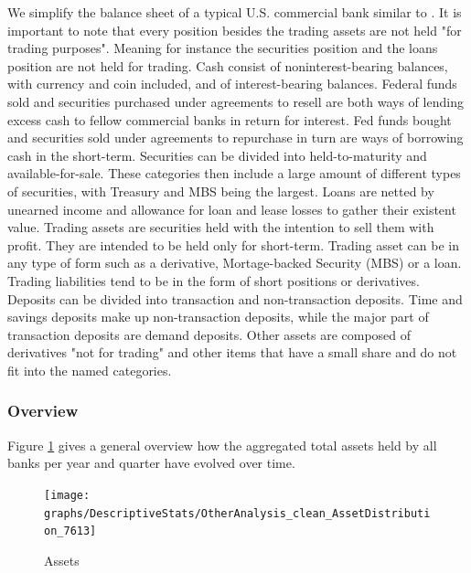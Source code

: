 \documentclass[12pt, a4paper]{article} %
\begin{document}
We simplify the balance sheet of a typical U.S. commercial bank similar to \citet{DrechslerSchnabel2017}.
It is important to note that every position besides the trading assets are not held "for trading purposes". Meaning for instance the securities position and the loans position are not held for trading.
Cash consist of noninterest-bearing balances, with currency and coin included, and of interest-bearing balances.
Federal funds sold and securities purchased under agreements to resell are both ways of lending excess cash to fellow commercial banks in return for interest. Fed funds bought and securities sold under agreements to repurchase in turn are ways of borrowing cash in the short-term. Securities can be divided into held-to-maturity and available-for-sale. These categories then include a large amount of different types of securities, with Treasury and MBS being the largest. Loans are netted by unearned income and allowance for loan and lease losses to gather their existent value. Trading assets are securities held with the intention to sell them with profit. They are intended to be held only for short-term. Trading asset can be in any type of form such as a derivative, Mortage-backed Security (MBS) or a loan. Trading liabilities tend to be in the form of short positions or derivatives. Deposits can be divided into transaction and non-transaction deposits. Time and savings deposits make up non-transaction deposits, while the major part of transaction deposits are demand deposits. Other assets are composed of derivatives "not for trading" and other items that have a small share and do not fit into the named categories.
 
\subsubsection{Overview}
Figure \ref{fig:assets} gives a general overview how the aggregated total assets held by all banks per year and quarter have evolved over time. 
 
\begin{figure}[H]
\begin{minipage}{\textwidth}
\texttt{[image: graphs/DescriptiveStats/OtherAnalysis\_clean\_AssetDistribution\_7613]}
\caption[1]{Assets}
\label{fig:assets}
\end{minipage}
\end{figure} 
 
\end{document}
